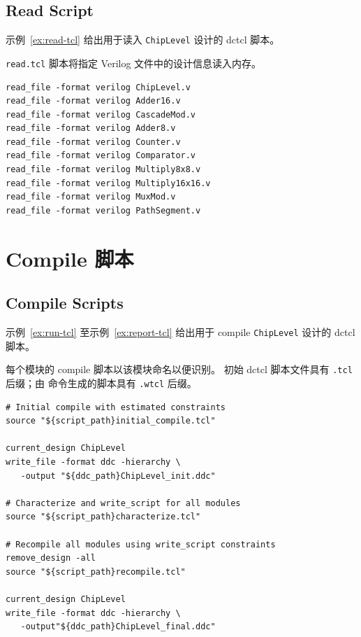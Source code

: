 \subsection*{Read Script}

示例~\ref{ex:read-tcl} 给出用于读入 \texttt{ChipLevel} 设计的 dctcl 脚本。

\texttt{read.tcl} 脚本将指定 Verilog 文件中的设计信息读入内存。

\begin{lstlisting}[caption={read.tcl},label=ex:read-tcl]
read_file -format verilog ChipLevel.v
read_file -format verilog Adder16.v
read_file -format verilog CascadeMod.v
read_file -format verilog Adder8.v
read_file -format verilog Counter.v
read_file -format verilog Comparator.v
read_file -format verilog Multiply8x8.v
read_file -format verilog Multiply16x16.v
read_file -format verilog MuxMod.v
read_file -format verilog PathSegment.v
\end{lstlisting}

\section{Compile 脚本}
\subsection*{Compile Scripts}

示例~\ref{ex:run-tcl} 至示例~\ref{ex:report-tcl} 给出用于 compile \texttt{ChipLevel} 设计的 dctcl 脚本。

每个模块的 compile 脚本以该模块命名以便识别。
初始 dctcl 脚本文件具有 \texttt{.tcl} 后缀；由  命令生成的脚本具有 \texttt{.wtcl} 后缀。

\begin{lstlisting}[caption={run.tcl},label=ex:run-tcl]
# Initial compile with estimated constraints
source "${script_path}initial_compile.tcl"

current_design ChipLevel
write_file -format ddc -hierarchy \
   -output "${ddc_path}ChipLevel_init.ddc"

# Characterize and write_script for all modules
source "${script_path}characterize.tcl"

# Recompile all modules using write_script constraints
remove_design -all
source "${script_path}recompile.tcl"

current_design ChipLevel
write_file -format ddc -hierarchy \
   -output"${ddc_path}ChipLevel_final.ddc"
\end{lstlisting}

